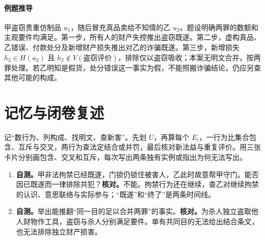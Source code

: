 \paragraph{例题推导}
甲盗窃贵重仿制品 \(u_1\)，随后冒充真品卖给不知情的乙 \(u_2\)。题设明确两罪的数额和主观要件均满足。第一步，所有人的财产失控推出盗窃既遂。第二步，虚构真品、乙错误、付款处分及新增财产损失推出对乙的诈骗既遂。第三步，新增损失 \(h_2\in H(u_2)\) 且 \(h_2\notin V(\text{盗窃评价})\)，排除仅以盗窃吸收；本案无明文合并，按两罪处理。若乙明知是假货，处分错误这一事实为假，不能照搬诈骗结论，仍应另查其他可能的构成。

\section*{记忆与闭卷复述}
记“数行为、列构成、找明文、查新害”。先划 \(U\)，再算每个 \(E_i\)，一行为比集合包含、互斥与交叉，两行为查法定结合或并罚，最后核对新法益与重复评价。用三张卡片分别画包含、交叉和互斥，每次写出两条独有实例或指出为何无法写出。
\begin{enumerate}
 \item \textbf{自测。}甲非法拘禁已经既遂，门锁仍锁住被害人，乙此时故意帮甲守门。能否因已既遂而一律排除共犯？\quad\textbf{核对。}不能。拘禁行为还在继续，查乙对继续拘禁的认识、意思联络与实际参与；“既遂”和“终了”是两条时间线。
 \item \textbf{自测。}举出能推翻“同一目的足以合并两罪”的事实。\quad\textbf{核对。}为杀人独立盗取他人财物作工具，盗窃与杀人分别满足要件。单有共同目的无法给出结合条文，也无法排除独立财产损害。
\end{enumerate}
